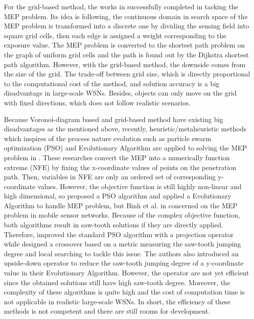 \documentclass[final]{elsarticle}
\begin{document}
For the grid-based method, the works in \cite{meguerdichian2001exposure, veltri2003minimal,megerian2002exposure, b9, b10} successfully completed in tacking the MEP problem. Its idea is following, the continuous domain in search space of the MEP problem is transformed into a discrete one by dividing the sensing field into square grid cells, then each edge is assigned a weight corresponding to the exposure value. The MEP problem is converted to the shortest path problem on the graph of uniform grid cells and the path is found out by the Dijkstra shortest path algorithm. However, with the grid-based method, the downside comes from the size of the grid. The trade-off between grid size, which is directly proportional to the computational cost of the method, and solution accuracy is a big disadvantage in large-scale WSNs. Besides, objects can only move on the grid with fixed directions, which does not follow realistic scenarios.

Because Voronoi-diagram based and grid-based method have existing big disadvantages as the mentioned above, recently, heuristic/metaheuristic methods which inspires of the process nature evolution such as particle swarm optimization (PSO) and Evolutionary Algorithm are applied to solving the MEP problem in \cite{b11,b12,b25,binh2019efficient}. These researches convert the MEP into a numerically function extreme (NFE) \cite{b8} by fixing the x-coordinate values of points on the penetration path. Then, variables in NFE are only an ordered set of corresponding y-coordinate values. However, the objective function is still highly non-linear and high dimensional, so \cite{b11} proposed a PSO algorithm and \cite {b12,b25,binh2019efficient} applied a Evolutionary Algorithm to handle MEP problem, but Binh et al. in \cite{b25} concerned on the MEP problem in mobile sensor networks. Because of the complex objective function, both algorithms result in saw-tooth solutions if they are directly applied. Therefore, \cite{b11} improved the standard PSO algorithm with a projection operator while \cite{binh2019efficient} designed a crossover based on a metric measuring the saw-tooth jumping degree and local searching to tackle this issue. The authors \cite{b12} also introduced an upside-down operator to reduce the saw-tooth jumping degree of a y-coordinate value in their Evolutionary Algorithm. However, the operator are not yet efficient since the obtained solutions still have high saw-tooth degree. Moreover, the complexity of these algorithms is quite high and the cost of computation time is not applicable in realistic large-scale WSNs. In short, the efficiency of these methods is not competent and there are still rooms for development.
\end{document}
